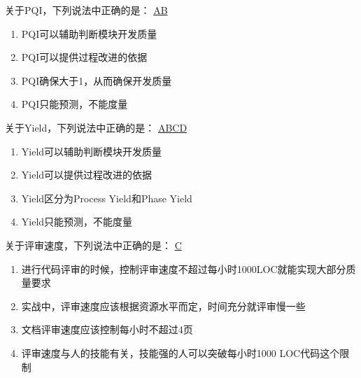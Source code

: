 \begin{problem}
	关于PQI，下列说法中正确的是：
	\uline{AB}
    \vspace{-0.8em}
    \begin{multicols}{2}
        \begin{enumerate}[label=\Alph*.]
            \item PQI可以辅助判断模块开发质量
            \item PQI可以提供过程改进的依据
            \item PQI确保大于1，从而确保开发质量
            \item PQI只能预测，不能度量
        \end{enumerate}
    \end{multicols}
    \vspace{-1em}
\end{problem}



\begin{problem}
	关于Yield，下列说法中正确的是： 
	\uline{ABCD}
    \vspace{-0.8em}
    \begin{multicols}{2}
        \begin{enumerate}[label=\Alph*.]
            \item Yield可以辅助判断模块开发质量
            \item Yield可以提供过程改进的依据
            \item Yield区分为Process Yield和Phase Yield
            \item Yield只能预测，不能度量
        \end{enumerate}
    \end{multicols}
    \vspace{-1em}
\end{problem}



\begin{problem}
	关于评审速度，下列说法中正确的是：
	\uline{C}
        \begin{enumerate}[label=\Alph*.]
            \item 进行代码评审的时候，控制评审速度不超过每小时1000LOC就能实现大部分质量要求
            \item 实战中，评审速度应该根据资源水平而定，时间充分就评审慢一些
            \item 文档评审速度应该控制每小时不超过4页
            \item 评审速度与人的技能有关，技能强的人可以突破每小时1000 LOC代码这个限制
        \end{enumerate}
\end{problem}




